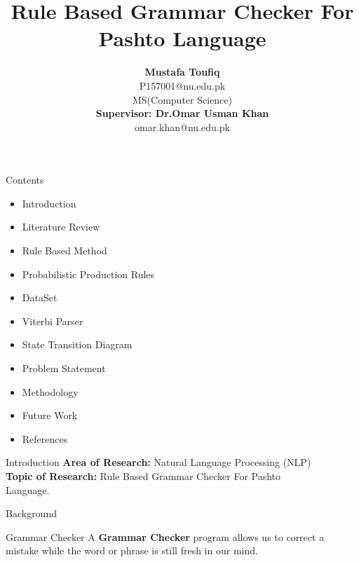 \documentclass{beamer}
\title{Rule Based Grammar Checker For Pashto Language} \vspace{1em}
\author[1]{\textbf {Mustafa Toufiq} \\ P157001@nu.edu.pk \\ \vspace{1.5em} MS(Computer Science)\\ \vspace{1.5em} \textbf{Supervisor:  Dr.Omar Usman Khan}\\ omar.khan@nu.edu.pk}
\institute{\textbf{National University of Computer and Emerging Sciences}}
\begin{document}
\thispagestyle{empty}
\setcounter{page}{1}
\newpage


\newcommand{\seti}{\setcounter{saveenumi}{\value{enumi}}}
\newcommand{\conti}{\setcounter{enumi}{\value{saveenumi}}}


	
\begin{frame}
\titlepage
\end{frame}



\begin{frame}{Contents}
\begin{itemize}
\item Introduction
\vspace{0.2em}
\item Literature Review
\vspace{0.2em}
\item Rule Based Method
\vspace{0.2em}
\item Probabilistic Production Rules
\vspace{0.2em}
\item DataSet
\vspace{0.2em}
\item Viterbi Parser
\vspace{0.2em}
\item State Transition Diagram
\vspace{0.2em}
\item Problem Statement
\vspace{0.2em}
\item Methodology
\vspace{0.2em}
\item Future Work
\vspace{0.2em}
\item References
\end{itemize}
\end{frame}


\begin{frame}{Introduction}
\textbf{Area of Research:} Natural Language Processing (NLP) \\
\vspace{1em}
\textbf{Topic of Research:} Rule Based Grammar Checker For Pashto \\ \vspace{0.2em} \hspace{3.3cm} Language.
\end{frame}


\begin{frame}{Background}
\begin{block}{Grammar Checker}
\vspace{0.5em}
A \textbf {Grammar Checker} program allows us to correct a mistake while the
word or phrase is still fresh in our mind.
\vspace{0.5em}	
\end{block}
\end{frame}
\end{document}
